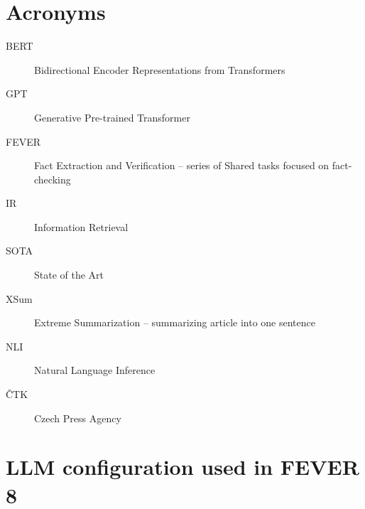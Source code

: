 \documentclass[oneside]{ctuthesis}
\theoremstyle{plain}
\theoremstyle{definition}
\theoremstyle{note}
\begin{document}
\maketitle










%


\appendix
%
\chapter{Acronyms}
\begin{description}
\item[BERT] Bidirectional Encoder Representations from Transformers
\item[GPT] Generative Pre-trained Transformer 
\item[FEVER] Fact Extraction and Verification -- series of Shared tasks focused on fact-checking
\item[IR] Information Retrieval
\item[SOTA] State of the Art
\item[XSum] Extreme Summarization -- summarizing article into one sentence
\item[NLI] Natural Language Inference
\item[ČTK] Czech Press Agency
\end{description}

\chapter{LLM configuration used in FEVER 8}
\end{document}
